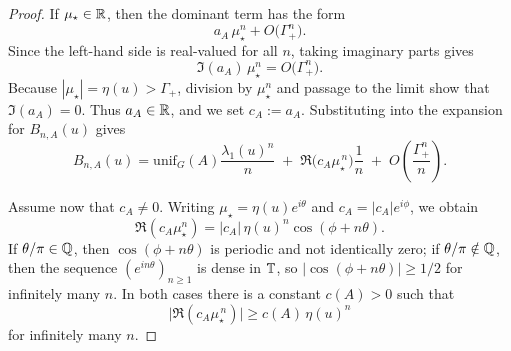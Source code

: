 \begin{proof}
If \(\mu_\star\in\mathbb{R}\), then the dominant term has the form
\[
a_A\,\mu_\star^n+O\!\bigl(\Gamma_+^n\bigr).
\]
Since the left-hand side is real-valued for all \(n\), taking imaginary parts gives
\[
\Im(a_A)\,\mu_\star^n=O\!\bigl(\Gamma_+^n\bigr).
\]
Because \(|\mu_\star|=\eta(u)>\Gamma_+\), division by \(\mu_\star^n\) and passage to the limit show that \(\Im(a_A)=0\). Thus \(a_A\in\mathbb{R}\), and we set \(c_A:=a_A\). Substituting into the expansion for \(B_{n,A}(u)\) gives
\[
B_{n,A}(u)
=
\mathrm{unif}_G(A)\frac{\lambda_1(u)^n}{n}
\;+\;
\Re\!\bigl(c_A\mu_\star^{\,n}\bigr)\frac{1}{n}
\;+\;
O\!\left(\frac{\Gamma_+^n}{n}\right).
\]

Assume now that \(c_A\neq 0\). Writing \(\mu_\star=\eta(u)e^{i\theta}\) and \(c_A=|c_A|e^{i\phi}\), we obtain
\[
\Re(c_A\mu_\star^n)=|c_A|\,\eta(u)^n\cos(\phi+n\theta).
\]
If \(\theta/\pi\in\mathbb{Q}\), then \(\cos(\phi+n\theta)\) is periodic and not identically zero; if \(\theta/\pi\notin\mathbb{Q}\), then the sequence \((e^{in\theta})_{n\ge 1}\) is dense in \(\mathbb{T}\), so \(|\cos(\phi+n\theta)|\ge 1/2\) for infinitely many \(n\). In both cases there is a constant \(c(A)>0\) such that
\[
\bigl|\Re(c_A\mu_\star^{\,n})\bigr|\ge c(A)\,\eta(u)^n
\]
for infinitely many \(n\).
\end{proof}

\endinput
